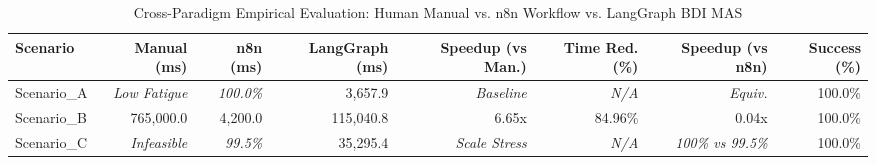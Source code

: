 \begin{table}[htbp]
\centering
\caption{Cross-Paradigm Empirical Evaluation: Human Manual vs. n8n Workflow vs. LangGraph BDI MAS}
\label{tab:empirical_evaluation}
\begin{tabular}{lrrrrrrr}
\toprule
\textbf{Scenario} & \textbf{Manual (ms)} & \textbf{n8n (ms)} & \textbf{LangGraph (ms)} & \textbf{Speedup (vs Man.)} & \textbf{Time Red. (\%)} & \textbf{Speedup (vs n8n)} & \textbf{Success (\%)} \\
\midrule
Scenario\_A & \textit{Low Fatigue} & \textit{100.0\%} & 3,657.9 & \textit{Baseline} & \textit{N/A} & \textit{Equiv.} & 100.0\% \\
Scenario\_B & 765,000.0 & 4,200.0 & 115,040.8 & 6.65x & 84.96\% & 0.04x & 100.0\% \\
Scenario\_C & \textit{Infeasible} & \textit{99.5\%} & 35,295.4 & \textit{Scale Stress} & \textit{N/A} & \textit{100\% vs 99.5\%} & 100.0\% \\
\bottomrule
\end{tabular}
\end{table}